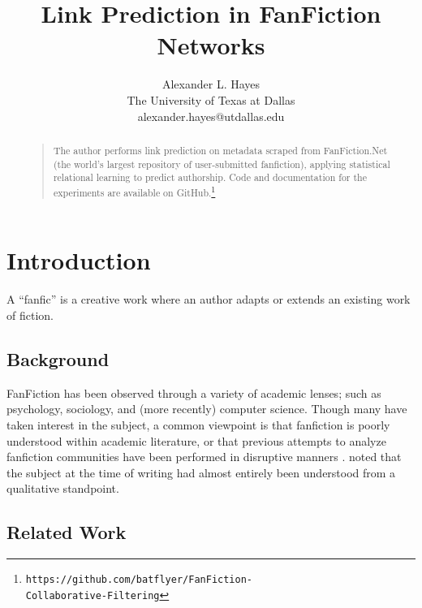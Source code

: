 \documentclass[letterpaper]{article}
\begin{document}
%

\title{Link Prediction in FanFiction Networks}
\author{Alexander L. Hayes\\
The University of Texas at Dallas\\
alexander.hayes@utdallas.edu\\
}

\maketitle
\begin{abstract}
\begin{quote}
The author performs link prediction on metadata scraped from FanFiction.Net (the world's largest repository of user-submitted fanfiction), applying statistical relational learning to predict authorship. Code and documentation for the experiments are available on GitHub.\footnote{\texttt{https://github.com/batflyer/FanFiction-\\Collaborative-Filtering}}
\end{quote}
\end{abstract}

\section{Introduction}
A ``fanfic'' is a creative work where an author adapts or extends an existing work of fiction.

\subsection{Background}

FanFiction has been observed through a variety of academic lenses; such as psychology, sociology, and (more recently) computer science. Though many have taken interest in the subject, a common viewpoint is that fanfiction is poorly understood within academic literature, or that previous attempts to analyze fanfiction communities have been performed in disruptive manners \cite{larsen2011fandom}. \cite{barnes2015fanfiction} noted that the subject at the time of writing had almost entirely been understood from a qualitative standpoint.

\subsection{Related Work}
\end{document}
